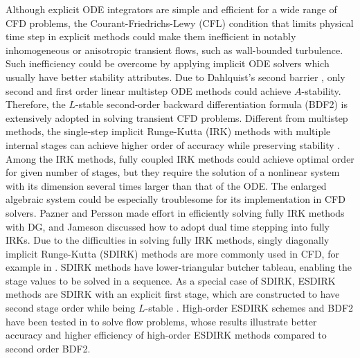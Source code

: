Although explicit ODE integrators
are simple and efficient for a wide range of
CFD problems,
the Courant-Friedrichs-Lewy (CFL) condition
that limits physical time step in explicit
methods could make them inefficient in
notably inhomogeneous or anisotropic
transient flows,
such as wall-bounded turbulence.
Such inefficiency could be overcome by
applying implicit ODE solvers which
usually have better stability attributes.
Due to Dahlquist's second barrier
\cite{dahlquist1963special},
only second and first order linear multistep ODE methods
could achieve $A$-stability.
Therefore,
the $L$-stable
second-order backward differentiation formula (BDF2)
is extensively adopted in solving transient CFD problems.
Different from multistep methods,
the single-step implicit Runge-Kutta (IRK) methods
with multiple internal stages
can achieve higher order of accuracy while
preserving stability \cite{butcher2016ODEBook}.
Among the IRK methods, fully coupled IRK methods
could achieve optimal order
for given number of stages,
but they require the solution of a nonlinear
system with its dimension several times larger
than that of the ODE.
The enlarged algebraic system
could be especially troublesome for its implementation in
CFD solvers.
Pazner and Persson
\cite{pazner2017stage}
made effort in efficiently solving
fully IRK methods with DG, and
Jameson \cite{jameson2017evaluation}
discussed how to adopt dual time stepping
into fully IRKs.
Due to the difficulties in solving
fully IRK methods,
singly diagonally implicit Runge-Kutta (SDIRK)
methods are more commonly used in CFD, for example in
\cite{wang2017compact_VR}.
SDIRK methods have lower-triangular butcher tableau,
enabling the stage values to be solved in a sequence.
As a special case of SDIRK,
ESDIRK methods are SDIRK with an explicit first stage,
which are constructed to have
second stage order while being $L$-stable
\cite{kennedy2003additiveARK,kvaerno2004singly}.
High-order ESDIRK schemes and
BDF2 have been tested in
\cite{
    bijl2002implicitBDFvESDIRK,
    wang2007implicitDGTests}
to solve flow problems,
whose results illustrate
better accuracy and higher efficiency
of high-order ESDIRK methods
compared to second order BDF2.


